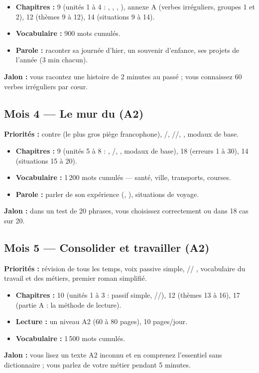 \begin{itemize}
  \item \textbf{Chapitres :} 9 (unités 1 à 4 : , ,
  , ), annexe A (verbes irréguliers, groupes 1 et 2),
  12 (thèmes 9 à 12), 14 (situations 9 à 14).
  \item \textbf{Vocabulaire :} 900 mots cumulés.
  \item \textbf{Parole :} raconter sa journée d'hier, un souvenir d'enfance, ses projets
  de l'année (3 min chacun).
\end{itemize}
\textbf{Jalon :} vous racontez une histoire de 2 minutes au passé ; vous connaissez
60 verbes irréguliers par c\oe ur.

\subsection{Mois 4 --- Le mur du  (A2)}
\textbf{Priorités :}  contre  (le plus gros piège
francophone), /, //, ,
modaux de base.

\begin{itemize}
  \item \textbf{Chapitres :} 9 (unités 5 à 8 : , /, , modaux de base), 18 (erreurs 1 à 30), 14 (situations 15 à 20).
  \item \textbf{Vocabulaire :} 1\,200 mots cumulés --- santé, ville, transports, courses.
  \item \textbf{Parole :} parler de son expérience (, ),
  situations de voyage.
\end{itemize}
\textbf{Jalon :} dans un test de 20 phrases, vous choisissez correctement 
ou  dans 18 cas sur 20.

\subsection{Mois 5 --- Consolider et travailler (A2)}
\textbf{Priorités :} révision de tous les temps, voix passive simple, //
, vocabulaire du travail et des métiers, premier roman simplifié.

\begin{itemize}
  \item \textbf{Chapitres :} 10 (unités 1 à 3 : passif simple, //),
  12 (thèmes 13 à 16), 17 (partie A : la méthode de lecture).
  \item \textbf{Lecture :} un  niveau A2 (60 à 80 pages), 10 pages/jour.
  \item \textbf{Vocabulaire :} 1\,500 mots cumulés.
\end{itemize}
\textbf{Jalon :} vous lisez un texte A2 inconnu et en comprenez l'essentiel sans dictionnaire ;
vous parlez de votre métier pendant 5 minutes.

